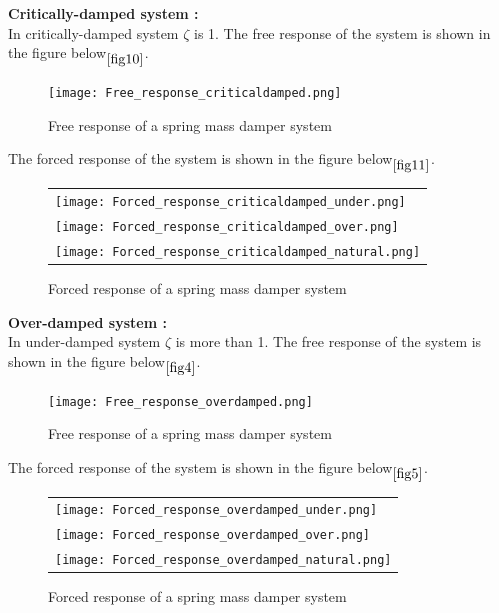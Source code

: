 \documentclass[11pt]{article}
\begin{document}
\newpage
\noindent\textbf{Critically-damped system :} \\
In critically-damped system $\zeta$ is 1.
The free response of the system is shown in the figure below$\phantom{}_{\ref{fig10}}$.

\begin{figure}[H]
	\centering
	\centering
	\texttt{[image: Free\_response\_criticaldamped.png]}
	\caption{Free response of a spring mass damper system}
\end{figure}
\label{fig10}

\newpage
The forced response of the system is shown in the figure below$\phantom{}_{\ref{fig11}}$.

\begin{figure}[H]
	\centering
	\begin{tabular} {l}
	\texttt{[image: Forced\_response\_criticaldamped\_under.png]} \\
	\texttt{[image: Forced\_response\_criticaldamped\_over.png]} \\
	\texttt{[image: Forced\_response\_criticaldamped\_natural.png]} 
	\end{tabular}
	\caption{Forced response of a spring mass damper system}
\end{figure}
\label{fig11}


 
\newpage
\noindent\textbf{Over-damped system :} \\
In under-damped system $\zeta$ is more than 1.
The free response of the system is shown in the figure below$\phantom{}_{\ref{fig4}}$.

\begin{figure}[H]
	\centering
	\centering
	\texttt{[image: Free\_response\_overdamped.png]}
	\caption{Free response of a spring mass damper system}
\end{figure}
\label{fig4}

\newpage
The forced response of the system is shown in the figure below$\phantom{}_{\ref{fig5}}$.

\begin{figure}[H]
	\centering
	\begin{tabular} {l}
	\texttt{[image: Forced\_response\_overdamped\_under.png]} \\
	\texttt{[image: Forced\_response\_overdamped\_over.png]} \\
	\texttt{[image: Forced\_response\_overdamped\_natural.png]} 
	\end{tabular}
	\caption{Forced response of a spring mass damper system}
\end{figure}
\label{fig5}
\end{document}
